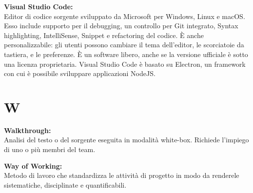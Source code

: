 \documentclass[a4paper, oneside, openany, dvipsnames, table]{article}
\begin{document}
\textbf{Visual Studio Code:}\\	Editor di codice sorgente sviluppato da Microsoft per Windows, Linux e macOS. Esso include supporto per il debugging, un controllo per Git integrato, Syntax highlighting, IntelliSense, Snippet e refactoring del codice. È anche personalizzabile: gli utenti possono cambiare il tema dell'editor,  le scorciatoie da tastiera, e le preferenze. È un software libero, anche se la versione ufficiale è sotto una licenza proprietaria. Visual Studio Code è basato su Electron, un framework con cui è possibile sviluppare applicazioni NodeJS.


\newpage
\section{W}
\textbf{Walkthrough:}\\
Analisi del testo o del sorgente eseguita in modalità white-box. Richiede l'impiego di uno o più membri del team.

\textbf{Way of Working:}\\
Metodo di lavoro che standardizza le attività di progetto in modo da renderele sistematiche, disciplinate
e quantificabili.
\end{document}
